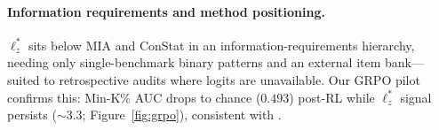 \paragraph{Information requirements and method positioning.}
$\ell_z^*$ sits below MIA \citep[logits;][]{minkprob2024} and ConStat \citep[multi-benchmark scores;][]{constat2024} in an information-requirements hierarchy, needing only single-benchmark binary patterns and an external item bank---suited to retrospective audits where logits are unavailable. Our GRPO pilot confirms this: Min-K\% AUC drops to chance ($0.493$) post-RL while $\ell_z^*$ signal persists (${\sim}3.3$; Figure~\ref{fig:grpo}), consistent with \citet{wang2025fragility}.
